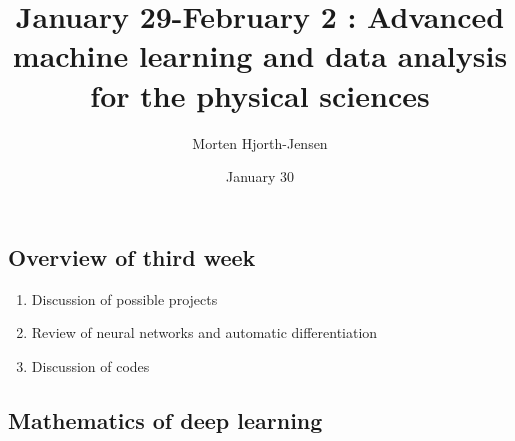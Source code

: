 \documentclass[%
oneside,                 %
final,                   %
10pt]{article}
\begin{document}

\newcommand{\exercisesection}[1]{\subsection*{#1}}






\title{January 29-February 2 : Advanced machine learning and data analysis for the physical sciences}


\author{Morten Hjorth-Jensen}

\date{January 30
}

\subsection{Overview of third  week}

\begin{block}{}
\begin{enumerate}
 \item Discussion of possible projects

 \item Review of neural networks and automatic differentiation

 \item Discussion of codes
\end{enumerate}

\noindent
\end{block}

\subsection{Mathematics of deep learning}
\end{document}
